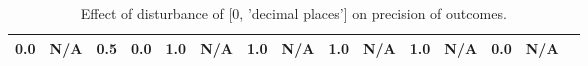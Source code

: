 \begin{table}
\begin{tabular}{l|cc|cc|cc|cc|cc|cc|cc}
\cellcolor{Bittersweet}0.0&\cellcolor{Bittersweet}N/A&\cellcolor{Bittersweet}0.5&\cellcolor{Bittersweet}0.0&\cellcolor{Bittersweet}1.0&\cellcolor{Bittersweet}N/A&\cellcolor{Bittersweet}1.0&\cellcolor{Bittersweet}N/A&\cellcolor{Bittersweet}1.0&\cellcolor{Bittersweet}N/A&\cellcolor{Bittersweet}1.0&\cellcolor{Bittersweet}N/A&\cellcolor{Bittersweet}0.0&\cellcolor{Bittersweet}N/A\\\bottomrule\end{tabular}\caption{Effect of disturbance of [0, 'decimal places'] on precision of outcomes.}\end{table}